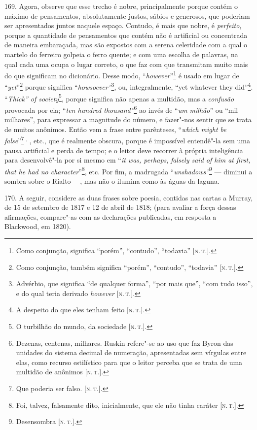 169. Agora, observe que esse trecho é nobre, principalmente porque
contém o máximo de pensamentos, absolutamente justos, sábios e
generosos, que poderiam ser apresentados juntos naquele espaço. Contudo,
é mais que nobre, é \emph{perfeito}, porque a quantidade de pensamentos
que contém não é artificial ou concentrada de maneira embaraçada, mas
são expostos com a serena celeridade com a qual o martelo do ferreiro
golpeia o ferro quente; e com uma escolha de palavras, na qual cada uma
ocupa o lugar correto, o que faz com que transmitam muito mais do que
significam no dicionário. Desse modo, ``\emph{however}''\footnote{Como
  conjunção, significa ``porém'', ``contudo'', ``todavia'' {[}\textsc{n.\,t.}{]}.} é usado em lugar de ``\emph{yet}''\footnote{Como conjunção,
  também significa ``porém'', ``contudo'', ``todavia'' {[}\textsc{n.\,t.}{]}.}
porque significa ``\emph{howsoever''}\footnote{Advérbio, que significa
  ``de qualquer forma'', ``por mais que'', ``com tudo isso'', e do qual
  teria derivado \emph{however} {[}\textsc{n.\,t.}{]}.}, ou, integralmente,
``yet whatever they did''\footnote{A despeito do que eles tenham feito
  {[}\textsc{n.\,t.}{]}.}. ``\emph{Thick'' of society}\footnote{O turbilhão do
  mundo, da sociedade {[}\textsc{n.\,t.}{]}.}, porque significa não apenas a
multidão, mas a \emph{confusão} provocada por ela; ``\emph{ten hundred
thousand''}\footnote{Dezenas, centenas, milhares. Ruskin refere"-se ao
  uso que faz Byron das unidades do sistema decimal de numeração,
  apresentadas sem vírgulas entre elas, como recurso estilístico para
  que o leitor perceba que se trata de uma multidão de anônimos {[}\textsc{n.\,t.}{]}.} ao invés de ``\emph{um milhão}'' ou ``mil milhares'', para
expressar a magnitude do número, e fazer"-nos sentir que se trata de
muitos anônimos. Então vem a frase entre parênteses, ``\emph{which might
be false}''\footnote{Que poderia ser falso. {[}\textsc{n.\,t.}{]}.}·, etc.,
que é realmente obscura, porque é impossível entendê"-la sem uma pausa
artificial e perda de tempo; e o leitor deve recorrer à própria
inteligência para desenvolvê"-la por si mesmo em ``\emph{it was,
perhaps}, \emph{falsely said of him at first, that he had no
character}''\footnote{Foi, talvez, falsamente dito, inicialmente, que
  ele não tinha caráter {[}\textsc{n.\,t.}{]}.}, etc. Por fim, a madrugada
``\emph{unshadows''}\footnote{Desensombra {[}\textsc{n.\,t.}{]}.} --- diminui a
sombra sobre o Rialto ---, mas não o ilumina como às águas da laguna.

170. A seguir, considere as duas frases sobre poesia, contidas nas
cartas a Murray, de 15 de setembro de 1817 e 12 de abril de 1818; (para
avaliar a força dessas afirmações, compare"-as com as declarações
publicadas, em resposta a Blackwood, em 1820).


